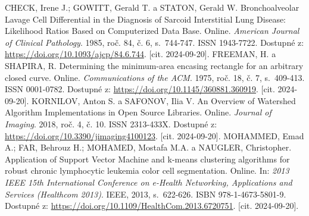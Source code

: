 % 
\begin{thebibliography}{4}

    CHECK, Irene J.; GOWITT, Gerald T. a STATON, Gerald W. Bronchoalveolar Lavage Cell Differential in the Diagnosis of Sarcoid Interstitial Lung Disease: Likelihood Ratios Based on Computerized Data Base. Online. \textit{American Journal of Clinical Pathology}. 1985, roč. 84, č. 6, s.~744-747. ISSN 1943-7722. Dostupné z: \url{https://doi.org/10.1093/ajcp/84.6.744}. [cit. 2024-09-20].
    FREEMAN, H. a SHAPIRA, R. Determining the minimum-area encasing rectangle for an arbitrary closed curve. Online. \textit{Communications of the ACM}. 1975, roč. 18, č. 7, s.~409-413. ISSN 0001-0782. Dostupné z: \url{https://doi.org/10.1145/360881.360919}. [cit. 2024-09-20].
    KORNILOV, Anton S. a SAFONOV, Ilia V. An Overview of Watershed Algorithm Implementations in Open Source Libraries. Online. \textit{Journal of Imaging}. 2018, roč. 4, č. 10. ISSN 2313-433X. Dostupné z: \url{https://doi.org/10.3390/jimaging4100123}. [cit. 2024-09-20].
    MOHAMMED, Emad A.; FAR, Behrouz H.; MOHAMED, Mostafa M.A. a NAUGLER, Christopher. Application of Support Vector Machine and k-means clustering algorithms for robust chronic lymphocytic leukemia color cell segmentation. Online. In: \textit{2013 IEEE 15th International Conference on e-Health Networking, Applications and Services (Healthcom 2013)}. IEEE, 2013, s.~622-626. ISBN 978-1-4673-5801-9. Dostupné z: \url{https://doi.org/10.1109/HealthCom.2013.6720751}. [cit. 2024-09-20].
    
\end{thebibliography}